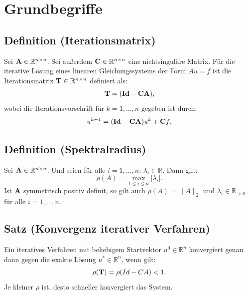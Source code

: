 \section{Grundbegriffe}\label{s.Grundbegriffe}

\subsection{Definition (Iterationsmatrix)}\label{ss.Iterationsmatrix}

Sei ${\textbf{A}} \in \mathbb{R}^{n \times n}$. Sei außerdem ${\textbf{C}} \in \mathbb{R}^{n \times n}$ eine nichtsinguläre Matrix. Für die iterative Lösung eines linearen Gleichungssystems der Form $Au = f$ ist die Iterationsmatrix ${\textbf{T}} \in \mathbb{R}^{n \times n}$ definiert als:
\begin{equation}
{\textbf{T}} = ({\textbf{Id}} - {\textbf{C}} {\textbf{A}}),
\end{equation}
wobei die Iterationsvorschrift für $k=1,...,n$ gegeben ist durch:
\begin{equation}
u^{k+1} = ({\textbf{Id}} - {\textbf{C}} {\textbf{A}})u^{k} + {\textbf{C}} f.\label{eq.Iteratives Verfahren}
\end{equation}

\subsection{Definition (Spektralradius)}\label{s.Spektralradius}

Sei ${\textbf{A}} \in \mathbb{R}^{n \times n}$. Und seien für alle $i=1,...,n$: $\lambda_{i} \in \mathbb{R}$. Dann gilt:
\begin{equation}
\rho(A) = \max_{1 \le i \le n} | \lambda_{i} |.
\end{equation}
Ist ${\textbf{A}}$ symmetrisch positiv definit, so gilt auch $\rho(A) = \| A \|_{2}$ und $\lambda_{i} \in \mathbb{R}_{>0}$ für alle $i=1,...,n$.

\subsection{Satz (Konvergenz iterativer Verfahren)}\label{ss.Konvergenz iterativer Verfahren}

Ein iteratives Verfahren mit beliebigem Startvektor $u^{0} \in \mathbb{R}^{n}$ konvergiert genau dann gegen die exakte Lösung $u^{*} \in \mathbb{R}^{n}$, wenn gilt:
\begin{equation}
\rho({\textbf{T}}) = \rho(Id - CA) < 1.
\end{equation}
Je kleiner $\rho$ ist, desto schneller konvergiert das System.

